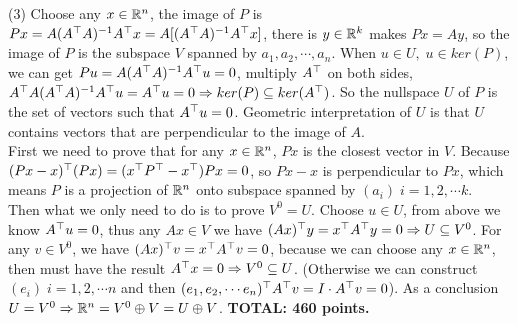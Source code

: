 \documentclass[12pt]{article}
\begin{document}
\medskip
(3) Choose any $x \in \mathbb{R}^n$, the image of $P$ is $Px = A(A^{\top}A)^{-1} A^{\top} x = A [(A^{\top}A)^{-1} A^{\top} x]$, there is $y \in \mathbb{R}^k$ makes $Px = Ay$, so the image of $P$ is the subspace $V$ spanned by $a_1, a_2, \cdots, a_n$.
When $u \in U ,\; u \in ker(P)$, we can get $Pu = A(A^{\top}A)^{-1} A^{\top} u = 0$, multiply $A^{\top}$ on both sides, $A^{\top} A (A^{\top}A)^{-1} A^{\top} u =  A^{\top} u = 0 \Rightarrow ker(P) \subseteq ker(A^{\top})$. So the nullspace $U$ of $P$ is the set of vectors such that $A^{\top} u = 0$. Geometric interpretation of $U$ is that $U$ contains vectors that are perpendicular to the image of $A$.\\
\medskip
First we need to prove that for any $x \in \mathbb{R}^n$, $Px$ is the closest vector in $V$. Because $(Px - x)^{\top} (Px) = (x^{\top} P^{\top} - x^{\top})Px = 0$, so $Px - x$ is perpendicular to $Px$, which means $P$ is a projection of $\mathbb{R}^n$ onto subspace spanned by $(a_i)\; i = 1,2,\cdots k$. \\
Then what we only need to do is to prove $V^0 = U$. Choose $u \in U$, from above we know $A^{\top} u = 0$, thus any $Ax \in V$ we have $(Ax)^{\top} y = x^{\top} A^{\top} y = 0 \Rightarrow U \subseteq V^0$. For any $v \in V^0$, we have $(A x )^{\top} v = x^{\top} A^{\top} v = 0$, because we can choose any $x \in \mathbb{R}^n$, then must have the result $A^{\top}x = 0 \Rightarrow V^0 \subseteq U$. (Otherwise we can construct $(e_i) \; i = 1,2,\cdots n$ and then $(e_1, e_2, \cdots e_n)^{\top} A^{\top} v  = I \cdot A^{\top} v = 0$). As a conclusion $U = V^0 \Rightarrow \mathbb{R}^n =  V^0 \oplus V = U \oplus V$.
\vspace{0.5cm}\noindent
{\bf TOTAL:  460 points.}
\end{document}
